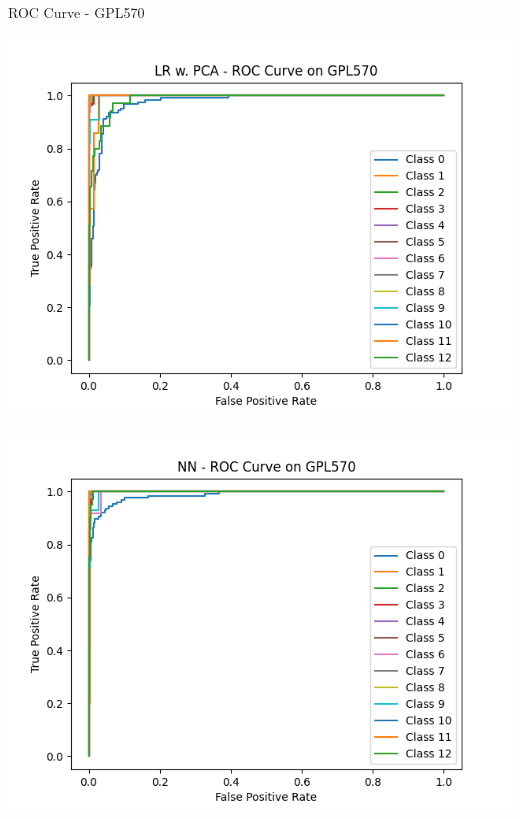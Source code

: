 \documentclass{beamer}
\begin{document}
    \begin{frame}{ROC Curve - GPL570}
        \begin{center}
            \hspace{-60pt}
            \begin{minipage}{0.4\textwidth}
                \includegraphics[scale=.4]{LRGPL570ROC.png}
            \end{minipage}
            \hspace{40pt}
            \begin{minipage}{0.4\textwidth}
                \includegraphics[scale=.4]{NNGPL570ROC.png}
            \end{minipage}
        \end{center}
    \end{frame}
\end{document}

